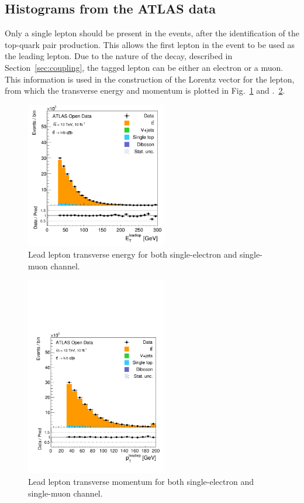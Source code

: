 \documentclass[12pt,a4paper]{article}
\numberwithin{equation}{section}
\begin{document}
\subsection{Histograms from the ATLAS data}
Only a single lepton should be present in the events, after the identification
of the top-quark pair production. This allows the first lepton in the event to
be used as the leading lepton. Due to the nature of the decay, described in
Section~\ref{sec:coupling}, the tagged lepton can be either an electron or a
muon. This information is used in the construction of the Lorentz vector for the
lepton, from which the transverse energy and momentum is plotted in
Fig.~\ref{fig:lepEt} and \Fig.~\ref{fig:leppt}.
\begin{figure}[H]
  \centering
  \includegraphics[width=0.55\textwidth]{figures/hist_leadleptEt}
  \caption{\label{fig:lepEt}Lead lepton transverse energy for both single-electron and single-muon channel.}
\end{figure}
\begin{figure}[H]
  \centering
  \includegraphics[width=0.55\textwidth]{figures/hist_leadleptpt}
  \caption{\label{fig:leppt}Lead lepton transverse momentum for both single-electron and single-muon channel.}
\end{figure}
\end{document}
